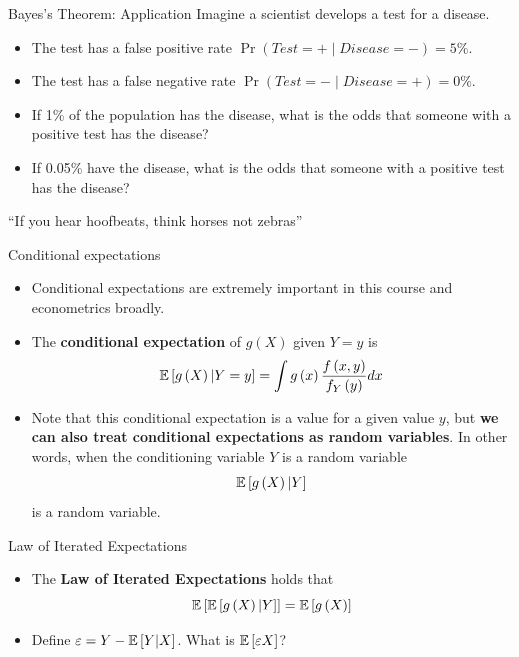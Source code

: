 \begin{frame}{Bayes's Theorem: Application}
Imagine a scientist develops a test for a disease.
\begin{itemize}
	\item The test has a false positive rate $\Pr(Test = + \mid Disease = -) = 5\%$.
	\item The test has a false negative rate $\Pr(Test = - \mid Disease = +) = 0\%$.
\end{itemize}
\begin{itemize}
	\item If 1\% of the population has the disease, what is the odds that someone with a positive test has the disease?
	\item If 0.05\% have the disease, what is the odds that someone with a positive test has the disease?
\end{itemize}
``If you hear hoofbeats, think horses not zebras''
\end{frame}


\begin{frame}{Conditional expectations}
\begin{itemize}
	\item Conditional expectations are extremely important in this course and econometrics broadly. 
	
	\medskip
	\item The {\bf conditional expectation} of $g\left(X\right)$ given $Y=y$ is\[
		\mathbb{E}\left[g\left( X\right) | Y=y\right] = \int g\left(x\right) \frac{f\left(x,y\right)}{f_{Y}\left(y\right)}dx
	\]
	
	\medskip
	\item Note that this conditional expectation is a value for a given value $y$, but {\bf we can also treat conditional
			expectations as random variables}. In other words, when the conditioning variable $Y$ is a random variable\[
			\mathbb{E}\left[g\left( X\right) | Y \right] 
			\]
			is a random variable.
			
\end{itemize}
\end{frame}





\begin{frame}{Law of Iterated Expectations}
\begin{itemize}
	\item The {\bf Law of Iterated Expectations} holds that\[
			\mathbb{E}\left[\mathbb{E}\left[g\left(X\right)|Y\right]\right] = \mathbb{E}\left[g\left(X\right)\right]
	\]
	
	\medskip
	\item Define $\varepsilon = Y - \mathbb{E}\left[Y|X\right]$. What is $\mathbb{E}\left[\varepsilon X\right]$?
\end{itemize}
\end{frame}



